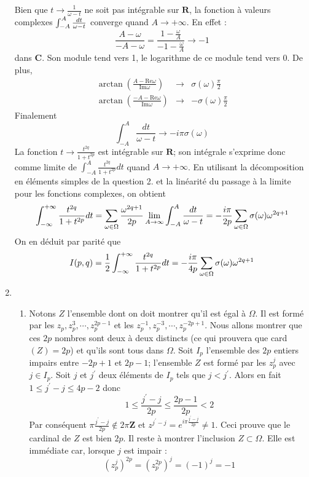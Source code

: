 \begin{enumerate}
Bien que $t\rightarrow \frac{1}{\omega -t}$ ne soit pas int\'{e}grable sur $%
\mathbf{R}$, la fonction \`{a} valeurs complexes $\int_{-A}^{A}\frac{dt}{%
\omega -t}$ converge quand $A\rightarrow +\infty $. En effet : 
\[
\frac{A-\omega }{-A-\omega }=\frac{1-\frac{\omega }{A}}{-1-\frac{\omega }{A}}%
\rightarrow -1 
\]
dans $\mathbf{C}$. Son module tend vers 1, le logarithme de ce module tend
vers 0. De plus, 
\begin{eqnarray*}
\arctan (\frac{A-\mathrm{Re}\omega }{\mathrm{Im}\omega }) &\rightarrow &\sigma
(\omega )\frac{\pi }{2} \\
\arctan (\frac{-A-\mathrm{Re}\omega }{\mathrm{Im}\omega }) &\rightarrow &-\sigma
(\omega )\frac{\pi }{2}
\end{eqnarray*}
Finalement 
\[
\int_{-A}^{A}\frac{dt}{\omega -t}\rightarrow -i\pi \sigma (\omega ) 
\]
La fonction $t\rightarrow \frac{t^{2q}}{1+t^{2p}}$ est int\'{e}grable sur $%
\mathbf{R}$; son int\'{e}grale s'exprime donc comme limite de $\int_{-A}^{A}%
\frac{t^{2q}}{1+t^{2p}}dt$ quand $A\rightarrow +\infty $. En utilisant la
d\'{e}composition en \'{e}l\'{e}ments simples de la question 2. et la
lin\'{e}arit\'{e} du passage \`{a} la limite pour les fonctions complexes,
on obtient 
\[
\int_{-\infty }^{+\infty }\frac{t^{2q}}{1+t^{2p}}dt=\sum_{\omega \in \Omega }%
\frac{\omega ^{2q+1}}{2p}\lim_{A\rightarrow \infty }\int_{-A}^{A}\frac{dt}{%
\omega -t}=-\frac{i\pi }{2p}\sum_{\omega \in \Omega }\sigma (\omega )\omega
^{2q+1} 
\]
On en d\'{e}duit par parit\'{e} que 
\[
I(p,q)=\frac{1}{2}\int_{-\infty }^{+\infty }\frac{t^{2q}}{1+t^{2p}}dt=-\frac{%
i\pi }{4p}\sum_{\omega \in \Omega }\sigma (\omega )\omega ^{2q+1} 
\]

\item 
\begin{enumerate}
\item  Notons $Z$ l'ensemble dont on doit montrer qu'il est \'{e}gal \`{a} $%
\Omega $. Il est form\'{e} par les $z_{p},z_{p}^{3},\cdots ,z_{p}^{2p-1}$ et
les $z_{p}^{-1},z_{p}^{-3},\cdots ,z_{p}^{-2p+1}.$ Nous allons montrer que
ces $2p$ nombres sont deux \`{a} deux distincts (ce qui prouvera que card$%
(Z)=2p$) et qu'ils sont tous dans $\Omega $.\newline
Soit $I_{p}$ l'ensemble des $2p$ entiers impairs entre $-2p+1$ et $2p-1$;
l'ensemble $Z$ est form\'{e} par les $z_{p}^{j}$ avec $j\in I_{p}$. Soit $j$
et $j^{\prime }$ deux \'{e}l\'{e}ments de $I_{p}$ tels que $j<j^{\prime }$.
Alors en fait $1\leq j^{\prime }-j\leq 4p-2$ donc 
\[
1\leq \frac{j^{\prime }-j}{2p}\leq \frac{2p-1}{2p}<2 
\]
Par cons\'{e}quent $\pi \frac{j^{\prime }-j}{2p}\notin 2\pi \mathbf{Z}$ et $%
z^{j^{\prime }-j}=e^{i\pi \frac{j^{\prime }-j}{2p}}\neq 1$. Ceci prouve que
le cardinal de $Z$ est bien $2p$. Il reste \`{a} montrer l'inclusion $%
Z\subset \Omega $.\newline
Elle est imm\'{e}diate car, lorsque $j$ est impair : 
\[
(z_{p}^{j})^{2p}=(z_{p}^{2p})^{j}=(-1)^{j}=-1 
\]


\end{enumerate}
\end{enumerate}
